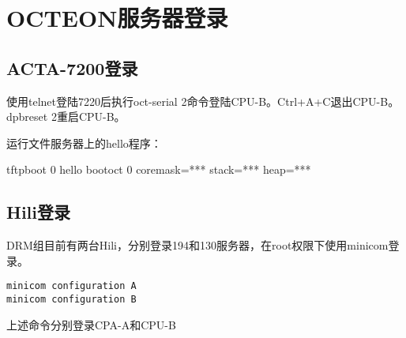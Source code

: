 
\section{OCTEON服务器登录}

\subsection{ACTA-7200登录}
使用telnet登陆7220后执行oct-serial 2命令登陆CPU-B。Ctrl+A+C退出CPU-B。dpbreset 2重启CPU-B。

运行文件服务器上的hello程序：
\begin{shellcmd}
tftpboot 0 hello
bootoct 0 coremask=*** stack=*** heap=***
\end{shellcmd}

\subsection{Hili登录}
DRM组目前有两台Hili，分别登录194和130服务器，在root权限下使用minicom登录。

\begin{verbatim}
minicom configuration A
minicom configuration B
\end{verbatim}

上述命令分别登录CPA-A和CPU-B
